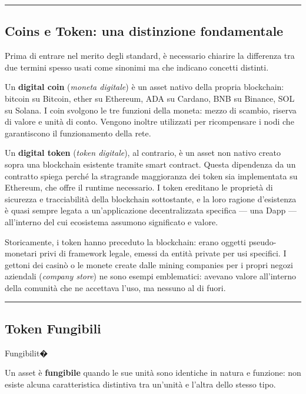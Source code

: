 \documentclass[
  italian,
  openany]{book}
\begin{document}
\begin{center}\rule{0.5\linewidth}{0.5pt}\end{center}

\subsection{Coins e Token: una distinzione
fondamentale}\label{coins-e-token-una-distinzione-fondamentale}

Prima di entrare nel merito degli standard, è necessario chiarire la
differenza tra due termini spesso usati come sinonimi ma che indicano
concetti distinti.

Un \textbf{digital coin} (\emph{moneta digitale}) è un asset nativo
della propria blockchain: bitcoin su Bitcoin, ether su Ethereum, ADA su
Cardano, BNB su Binance, SOL su Solana. I coin svolgono le tre funzioni
della moneta: mezzo di scambio, riserva di valore e unità di conto.
Vengono inoltre utilizzati per ricompensare i nodi che garantiscono il
funzionamento della rete.

Un \textbf{digital token} (\emph{token digitale}), al contrario, è un
asset non nativo creato sopra una blockchain esistente tramite smart
contract. Questa dipendenza da un contratto spiega perché la stragrande
maggioranza dei token sia implementata su Ethereum, che offre il runtime
necessario. I token ereditano le proprietà di sicurezza e tracciabilità
della blockchain sottostante, e la loro ragione d'esistenza è quasi
sempre legata a un'applicazione decentralizzata specifica --- una Dapp
--- all'interno del cui ecosistema assumono significato e valore.

Storicamente, i token hanno preceduto la blockchain: erano oggetti
pseudo-monetari privi di framework legale, emessi da entità private per
usi specifici. I gettoni dei casinò o le monete create dalle mining
companies per i propri negozi aziendali (\emph{company store}) ne sono
esempi emblematici: avevano valore all'interno della comunità che ne
accettava l'uso, ma nessuno al di fuori.

\begin{center}\rule{0.5\linewidth}{0.5pt}\end{center}

\subsection{Token Fungibili}\label{token-fungibili}

\begin{calloutdefinition}{Fungibilit�}

Un asset è \textbf{fungibile} quando le sue unità sono identiche in
natura e funzione: non esiste alcuna caratteristica distintiva tra
un'unità e l'altra dello stesso tipo.

\end{calloutdefinition}
\end{document}
